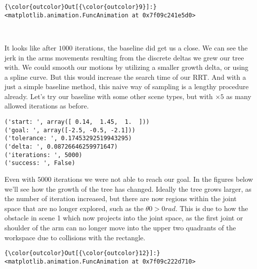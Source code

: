 \documentclass{article}
\begin{document}
            \begin{Verbatim}[commandchars=\\\{\}]
{\color{outcolor}Out[{\color{outcolor}9}]:} <matplotlib.animation.FuncAnimation at 0x7f09c241e5d0>
\end{Verbatim}
        
    \begin{center}
    \end{center}
    { \hspace*{\fill} \\}
    
    It looks like after $1000$ iterations, the baseline did get us a close.
We can see the jerk in the arms movements resulting from the discrete
deltas we grew our tree with. We could smooth our motions by utilizing a
smaller growth delta, or using a spline curve. But this would increase
the search time of our RRT. And with a just a simple baseline method,
this naive way of sampling is a lengthy procedure already. Let's try our
baseline with some other scene types, but with $\times 5$ as many
allowed iterations as before.


    \begin{Verbatim}[commandchars=\\\{\}]
('start: ', array([ 0.14,  1.45,  1.  ]))
('goal: ', array([-2.5, -0.5, -2.1]))
('tolerance: ', 0.17453292519943295)
('delta: ', 0.08726646259971647)
('iterations: ', 5000)
('success: ', False)
    \end{Verbatim}

    Even with $5000$ iterations we were not able to reach our goal. In the
figures below we'll see how the growth of the tree has changed. Ideally
the tree grows larger, as the number of iteration increased, but there
are now regions within the joint space that are no longer explored, such
as the $\theta0 > 0 rad$. This is due to how the obstacle in scene 1
which now projects into the joint space, as the first joint or shoulder
of the arm can no longer move into the upper two quadrants of the
workspace due to collisions with the rectangle.



            \begin{Verbatim}[commandchars=\\\{\}]
{\color{outcolor}Out[{\color{outcolor}12}]:} <matplotlib.animation.FuncAnimation at 0x7f09c222d710>
\end{Verbatim}
        
\end{document}
